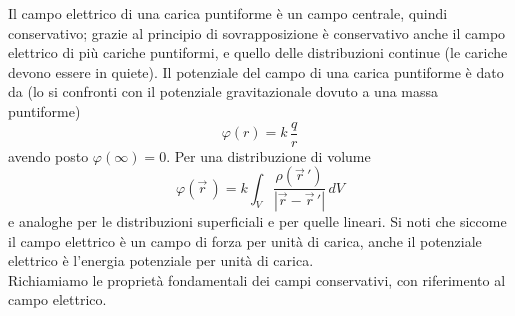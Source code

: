 Il campo elettrico di una carica puntiforme è un campo centrale, quindi conservativo; grazie al principio di sovrapposizione è conservativo anche il campo elettrico di più cariche puntiformi, e quello delle distribuzioni continue (le cariche devono essere in quiete). Il potenziale del campo di una carica puntiforme è dato da (lo si confronti con il potenziale gravitazionale dovuto a una massa puntiforme)
\begin{equation}
\varphi(r)=k\,\frac{q}{r}
\tag{1.58}
\end{equation}
avendo posto $\varphi(\infty)=0$. Per una distribuzione di volume
\begin{equation}
\varphi(\vec r\,)=k\int_V\frac{\rho(\vec r\,')}{|\vec r-\vec r\,'|}\,dV
\tag{1.59}
\end{equation}
e analoghe per le distribuzioni superficiali e per quelle lineari. Si noti che siccome il campo elettrico è un campo di forza per unità di carica, anche il potenziale elettrico è l'energia potenziale per unità di carica.\\
Richiamiamo le proprietà fondamentali dei campi conservativi, con riferimento al campo elettrico.
